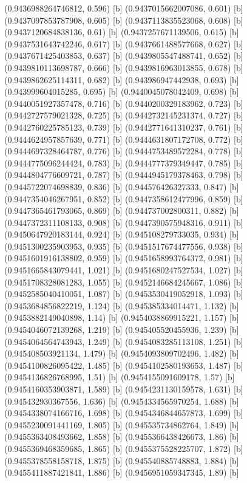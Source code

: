 {{{(0.9436988264746812, 0.596) [b] 
(0.9437015662007086, 0.601) [b] 
(0.9437097853787908, 0.605) [b] 
(0.9437113835523068, 0.608) [b] 
(0.9437120684838136, 0.61) [b] 
(0.9437257671139506, 0.615) [b] 
(0.9437531643742246, 0.617) [b] 
(0.9437661488577668, 0.627) [b] 
(0.9437671425403853, 0.637) [b] 
(0.9439805547488741, 0.652) [b] 
(0.9439810113698787, 0.666) [b] 
(0.9439816963013855, 0.678) [b] 
(0.9439862625114311, 0.682) [b] 
(0.943986947442938, 0.693) [b] 
(0.943999604015285, 0.695) [b] 
(0.9440045078042409, 0.698) [b] 
(0.9440051927357478, 0.716) [b] 
(0.9440200329183962, 0.723) [b] 
(0.9442727579021328, 0.725) [b] 
(0.9442732145231374, 0.727) [b] 
(0.9442760225785123, 0.739) [b] 
(0.9442771641310237, 0.761) [b] 
(0.9444624957857639, 0.771) [b] 
(0.9444631807172708, 0.772) [b] 
(0.9444697328464787, 0.776) [b] 
(0.9444753489572284, 0.778) [b] 
(0.9444775096244424, 0.783) [b] 
(0.9444777379349447, 0.785) [b] 
(0.9444804776609721, 0.787) [b] 
(0.9444945179378463, 0.798) [b] 
(0.9445722074698839, 0.836) [b] 
(0.944576426327333, 0.847) [b] 
(0.9447354046267951, 0.852) [b] 
(0.9447358612477996, 0.859) [b] 
(0.9447365461793065, 0.869) [b] 
(0.944737002800311, 0.882) [b] 
(0.9447372311108133, 0.908) [b] 
(0.9447390575948316, 0.911) [b] 
(0.9450647920183144, 0.924) [b] 
(0.945108279733035, 0.934) [b] 
(0.9451300235903953, 0.935) [b] 
(0.9451517674477556, 0.938) [b] 
(0.9451601916138802, 0.959) [b] 
(0.9451658993764372, 0.981) [b] 
(0.9451665843079441, 1.021) [b] 
(0.9451680247527534, 1.027) [b] 
(0.9451708328081283, 1.055) [b] 
(0.9452146684245667, 1.086) [b] 
(0.9452585040410051, 1.087) [b] 
(0.9453530419052918, 1.093) [b] 
(0.9453684856822219, 1.124) [b] 
(0.945385334014471, 1.132) [b] 
(0.9453882149040898, 1.14) [b] 
(0.9454038869915221, 1.157) [b] 
(0.9454046072139268, 1.219) [b] 
(0.945405520455936, 1.239) [b] 
(0.9454064564743943, 1.249) [b] 
(0.9454083285113108, 1.251) [b] 
(0.945408503921134, 1.479) [b] 
(0.9454093809702496, 1.482) [b] 
(0.9454100826095422, 1.485) [b] 
(0.9454102580193653, 1.487) [b] 
(0.9454136826768995, 1.51) [b] 
(0.9454155091609178, 1.57) [b] 
(0.9454160353903871, 1.589) [b] 
(0.9454231130159578, 1.631) [b] 
(0.945432930367556, 1.636) [b] 
(0.9454334565970254, 1.688) [b] 
(0.9454338074166716, 1.698) [b] 
(0.9454346844657873, 1.699) [b] 
(0.9455230091441169, 1.805) [b] 
(0.945535734862764, 1.849) [b] 
(0.9455363408493662, 1.858) [b] 
(0.9455366438426673, 1.86) [b] 
(0.9455369468359685, 1.865) [b] 
(0.9455375528225707, 1.872) [b] 
(0.9455378558158718, 1.875) [b] 
(0.945540885748883, 1.884) [b] 
(0.9455411887421841, 1.886) [b] 
(0.9456951059347345, 1.89) [b] 
}}}
